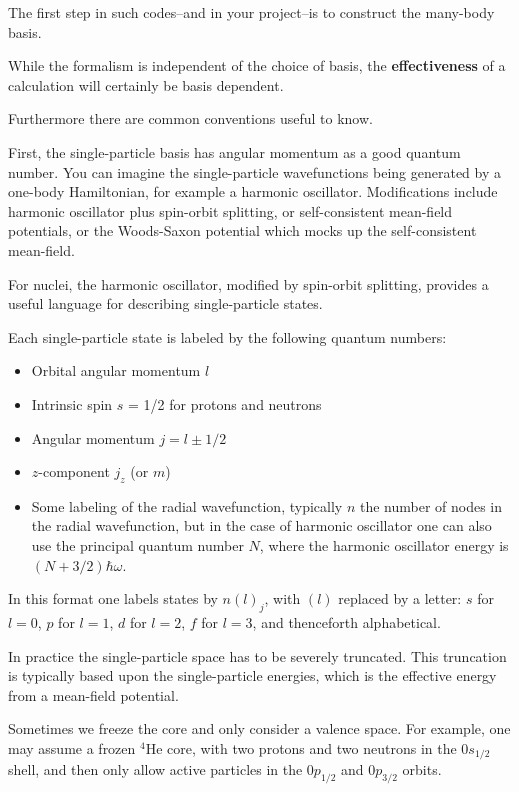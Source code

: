 \documentclass[graybox,sectrefs,envcountresetchap,open=right]{svmonodo}
\begin{document}
The first step in such codes--and in your project--is to construct the many-body basis.  

While the formalism is independent of the choice of basis, the \textbf{effectiveness} of a calculation 
will certainly be basis dependent. 

Furthermore there are common conventions useful to know.


First, the single-particle basis has angular momentum as a good quantum number.  You can 
imagine the single-particle wavefunctions being generated by a one-body Hamiltonian, 
for example a harmonic oscillator.  Modifications include harmonic oscillator plus 
spin-orbit splitting, or self-consistent mean-field potentials, or the Woods-Saxon potential which mocks 
up the self-consistent mean-field. 


For nuclei, the harmonic oscillator, modified by spin-orbit splitting, provides a useful language 
for describing single-particle states.


Each single-particle state is labeled by the following quantum numbers: 

\begin{itemize}
\item Orbital angular momentum $l$

\item Intrinsic spin $s$ = 1/2 for protons and neutrons

\item Angular momentum $j = l \pm 1/2$

\item $z$-component $j_z$ (or $m$)

\item Some labeling of the radial wavefunction, typically $n$ the number of nodes in  the radial wavefunction, but in the case of harmonic oscillator one can also use the principal quantum number $N$, where the harmonic oscillator energy is $(N+3/2)\hbar \omega$. 
\end{itemize}

\noindent
In this format one labels states by $n(l)_j$, with $(l)$ replaced by a letter:
$s$ for $l=0$, $p$ for $l=1$, $d$ for $l=2$, $f$ for $l=3$, and thenceforth alphabetical.


 In practice the single-particle space has to be severely truncated.  This truncation is 
typically based upon the single-particle energies, which is the effective energy 
from a mean-field potential. 

Sometimes we freeze the core and only consider a valence space. For example, one 
may assume a frozen ${}^{4}\mbox{He}$ core, with two protons and two neutrons in the $0s_{1/2}$ 
shell, and then only allow active particles in the $0p_{1/2}$ and $0p_{3/2}$ orbits. 
\end{document}
